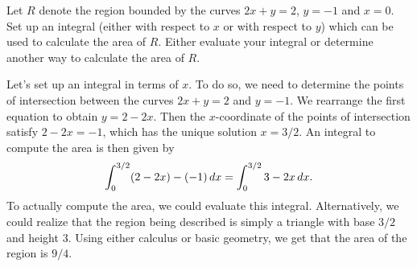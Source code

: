 \documentclass[]{ximera}
\begin{document}
\begin{problem}
Let $R$ denote the region bounded by the curves $2x+y=2$, $y=-1$ and $x=0$. Set up an integral (either with respect to $x$ or with respect to $y$) which can be used to calculate the area of $R$. Either evaluate your integral or determine another way to calculate the area of $R$. 
\end{problem}

\begin{freeResponse}
Let's set up an integral in terms of $x$. To do so, we need to determine the points of intersection between the curves $2x+y=2$ and $y=-1$. We rearrange the first equation to obtain $y=2-2x$. Then the $x$-coordinate of the points of intersection satisfy $2-2x = -1$, which has the unique solution $x= 3/2$. An integral to compute the area is then given by
$$
\int_0^{3/2} (2-2x) - (-1) \mathop{}\!d x = \int_0^{3/2} 3-2x \mathop{}\!d x.
$$
To actually compute the area, we could evaluate this integral. Alternatively, we could realize that the region being described is simply a triangle with base $3/2$ and height $3$. Using either calculus or basic geometry, we get that the area of the region is $9/4$.
\end{freeResponse}
\end{document}
